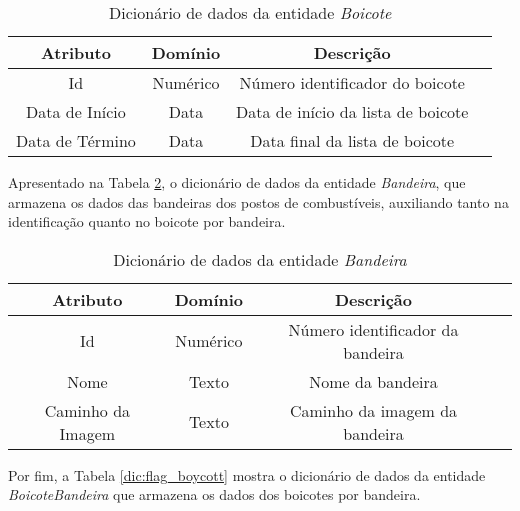 \begin{table}[H]
\centering
\caption{Dicionário de dados da entidade \textit{Boicote}}
\label{dic:boycott}
\begin{tabular}{|c|c|c|c|}\hline
\textbf{Atributo} & \textbf{Domínio}  & \textbf{Descrição}   \\ \hline
Id                            & Numérico                                                       & Número identificador do boicote \\ \hline
Data de Início                      & Data                                           & Data de início da lista de boicote \\ \hline
Data de Término                       & Data                                         & Data final da lista de boicote\\ \hline

\end{tabular}
\end{table}


Apresentado na Tabela \ref{dic:flag}, o dicionário de dados da entidade \textit{Bandeira}, que armazena os dados das bandeiras dos postos de combustíveis, auxiliando tanto na identificação quanto no boicote por bandeira.

\begin{table}[H]
\centering
\caption{Dicionário de dados da entidade \textit{Bandeira}}
\label{dic:flag}
\begin{tabular}{|c|c|c|c|}\hline
\textbf{Atributo} & \textbf{Domínio} & \textbf{Descrição}   \\ \hline
Id                            & Numérico                                                       & Número identificador da bandeira \\ \hline
Nome                      & Texto                                           & Nome da bandeira \\ \hline
Caminho da Imagem                       & Texto                                           & Caminho da imagem da bandeira\\ \hline

\end{tabular}
\end{table}

Por fim, a Tabela \ref{dic:flag_boycott} mostra o dicionário de dados da entidade \textit{BoicoteBandeira} que armazena os dados dos boicotes por bandeira.


